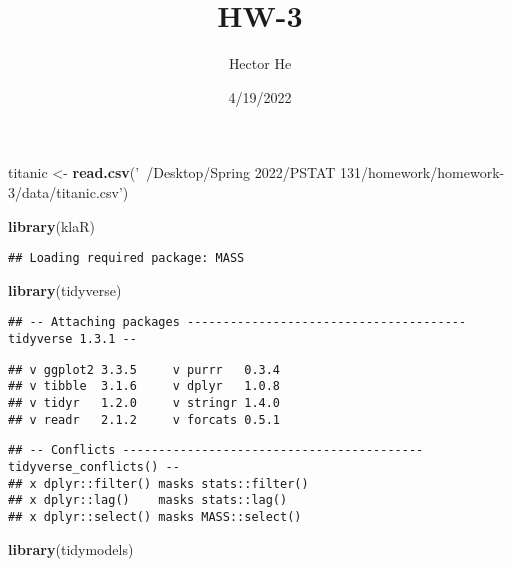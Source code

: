 \documentclass[]{article}
\title{HW-3}
\author{Hector He}
\date{4/19/2022}
\newenvironment{Shaded}{\begin{snugshade}}{\end{snugshade}}
\newcommand{\KeywordTok}[1]{\textcolor[rgb]{0.13,0.29,0.53}{\textbf{#1}}}
\newcommand{\NormalTok}[1]{#1}
\newcommand{\StringTok}[1]{\textcolor[rgb]{0.31,0.60,0.02}{#1}}
\begin{document}
\maketitle

\begin{Shaded}
\begin{Highlighting}[]
\NormalTok{titanic <-}\StringTok{ }\KeywordTok{read.csv}\NormalTok{(}\StringTok{'~/Desktop/Spring 2022/PSTAT 131/homework/homework-3/data/titanic.csv'}\NormalTok{)}
\end{Highlighting}
\end{Shaded}

\begin{Shaded}
\begin{Highlighting}[]
\KeywordTok{library}\NormalTok{(klaR)}
\end{Highlighting}
\end{Shaded}

\begin{verbatim}
## Loading required package: MASS
\end{verbatim}

\begin{Shaded}
\begin{Highlighting}[]
\KeywordTok{library}\NormalTok{(tidyverse)}
\end{Highlighting}
\end{Shaded}

\begin{verbatim}
## -- Attaching packages --------------------------------------- tidyverse 1.3.1 --
\end{verbatim}

\begin{verbatim}
## v ggplot2 3.3.5     v purrr   0.3.4
## v tibble  3.1.6     v dplyr   1.0.8
## v tidyr   1.2.0     v stringr 1.4.0
## v readr   2.1.2     v forcats 0.5.1
\end{verbatim}

\begin{verbatim}
## -- Conflicts ------------------------------------------ tidyverse_conflicts() --
## x dplyr::filter() masks stats::filter()
## x dplyr::lag()    masks stats::lag()
## x dplyr::select() masks MASS::select()
\end{verbatim}

\begin{Shaded}
\begin{Highlighting}[]
\KeywordTok{library}\NormalTok{(tidymodels)}
\end{Highlighting}
\end{Shaded}
\end{document}
